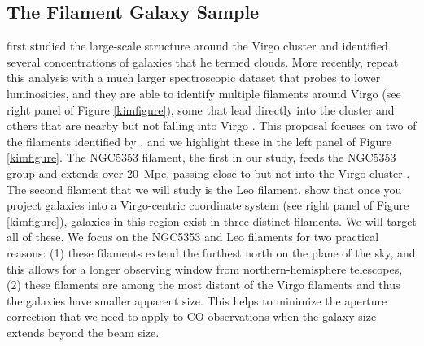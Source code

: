 \documentclass[11pt, preprint]{aastex}
\begin{document}
\vspace*{-1cm}\subsection{The Filament Galaxy Sample} 
\vspace*{-.4cm}
\citet{tully82} first studied the large-scale structure around the Virgo
cluster and identified several concentrations of galaxies that he
termed clouds.  More recently, \citet{kim16} repeat this analysis with
a much larger spectroscopic dataset that probes to lower luminosities,
and they are able to identify multiple
filaments around Virgo (see right panel of Figure \ref{kimfigure}), some that lead directly into the cluster and
others that are nearby but not falling into Virgo .
This proposal focuses on two of the filaments identified by
\citet{kim16}, and we highlight these in the left panel of Figure
\ref{kimfigure}.  The NGC5353 filament, the first in our study, feeds the NGC5353 group and extends over 20~Mpc,
passing close to but not into the Virgo cluster \citep{kim16}.  The second filament
that we will study is the Leo filament.  \citet{kim16} show that once
you project galaxies into a Virgo-centric coordinate system (see right
panel of Figure \ref{kimfigure}), galaxies
in this region exist in three distinct filaments.  We will target all
of these.  We focus on
the NGC5353 and Leo filaments for two practical reasons:  (1) these filaments
extend the furthest north on the plane of the sky, and this allows
for a longer observing window from northern-hemisphere telescopes, (2)
these filaments are among the most distant of the Virgo filaments and
thus the galaxies have smaller apparent size.  This helps to minimize
the aperture correction that we need to apply to CO observations when the galaxy size extends beyond the beam size.  
\end{document}
